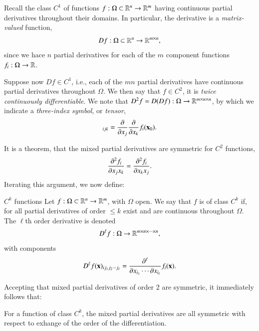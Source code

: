 Recall the class $C^1$ of functions $f : \Omega \subset \mathbb{R}^n \to \mathbb{R}^m$ having continuous partial derivatives throughout their domains. In particular, the derivative is a \emph{matrix-valued} function,
\begin{equation}
    Df : \Omega \subset \mathbb{R}^n \to \mathbb{R}^{m\times n},
\end{equation}
since we hace $n$ partial derivatives for each of the $m$ component functions $f_i : \Omega \to \mathbb{R}$.

Suppose now $Df \in C^1$, i.e., each of the $mn$ partial derivatives have continuous partial derivatives throughout $\Omega$. We then say that $f \in C^2$, it is \emph{twice continuously differentiable}. We note that $D^2f = D(Df) : \Omega \to \mathbb{R}^{m\times n \times n}$, by which we indicate a \emph{three-index symbol}, or \emph{tensor}, 
\begin{equation}
    [D^2f(\bvec{x}_0)]_{ijk} = \pdiff{}{x_j} \pdiff{}{x_k} f_i(\bvec{x}_0).
\end{equation}

It is a theorem, that the mixed partial derivatives are symmetric for $C^2$ functions,
\begin{equation}
    \frac{\partial ^2f_i }{\partial x_j x_k}=     \frac{\partial ^2f_i }{\partial x_k x_j}.
\end{equation}
Iterating this argument, we now define:
\begin{myDefinition}{$C^k$ functions}{}
Let $f : \Omega \subset\mathbb{R}^n\to\mathbb{R}^m$, with $\Omega$ open. We say that $f$ is of class $C^k$ if, for all  partial derivatives of order $\leq k$ exist and are continuous throughout $\Omega$. The $\ell$th order derivative is denoted 
\begin{equation}
    D^\ell f : \Omega \to \mathbb{R}^{m\times n\times \cdots \times n}, 
\end{equation}
with components
\begin{equation}
    D^\ell f(\mathbf{x})_{ij_1j_2\cdots j_\ell} = \frac{\partial ^\ell}{\partial x_{i_1}\cdots \partial x_{i_\ell}} f_i(\mathbf{x}).
\end{equation}
\end{myDefinition}

Accepting that mixed partial derivatives of order 2 are symmetric, it immediately follows that:
\begin{myTheorem}{}{}
    For a function of class $C^k$, the mixed partial derivatives are all symmetric with respect to exhange of the order of the differentiation.
\end{myTheorem}

